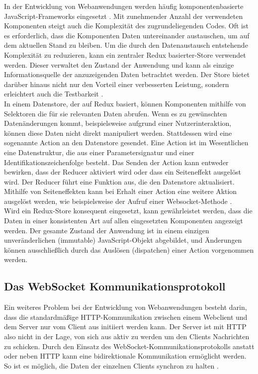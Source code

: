 \documentclass[12pt]{article} %
\begin{document}
In der Entwicklung von Webanwendungen werden häufig komponentenbasierte JavaScript-Frameworks eingesetzt \cite[1]{saks_javascript_2019}. 
Mit zunehmender Anzahl der verwendeten Komponenten steigt auch die Komplexität des zugrundeliegenden Codes. Oft ist es erforderlich, dass die Komponenten Daten untereinander austauschen, um auf dem aktuellen Stand zu bleiben. Um die durch den Datenaustausch entstehende Komplexität zu reduzieren, kann ein zentraler Redux basierter-Store verwendet werden. Dieser verwaltet den Zustand der Anwendung und kann als einzige Informationsquelle der anzuzeigenden Daten betrachtet werden. Der Store bietet darüber hinaus nicht nur den Vorteil einer verbesserten Leistung, sondern erleichtert auch die Testbarkeit \cite[31-32]{farhi_adding_2017}.
\\

In einem Datenstore, der auf Redux basiert, können Komponenten mithilfe von Selektoren die für sie relevanten Daten abrufen. Wenn es zu gewünschten Datenänderungen kommt, beispielsweise aufgrund einer Nutzerinteraktion, können diese Daten nicht direkt manipuliert werden. Stattdessen wird eine sogenannte Action an den Datenstore gesendet. Eine Action ist im Wesentlichen eine Datenstruktur, die aus einer Parametersignatur und einer Identifikationszeichenfolge besteht. Das Senden der Action kann entweder bewirken, dass der Reducer aktiviert wird oder dass ein Seiteneffekt ausgelöst wird. Der Reducer führt eine Funktion aus, die den Datenstore aktualisiert. Mithilfe von Seiteneffekten kann bei Erhalt einer Action eine weitere Aktion ausgelöst werden, wie beispielsweise der Aufruf einer Websocket-Methode
\cite[117-119]{thakkar_building_2020}. \\

Wird ein Redux-Store konsequent eingesetzt, kann gewährleistet werden, dass die Daten in einer konsistenten Art auf allen eingesetzten Komponenten angezeigt werden. Der gesamte Zustand der Anwendung ist in einem einzigen unveränderlichen (immutable) JavaScript-Objekt abgebildet, und Änderungen können ausschließlich durch das Auslösen (dispatchen) einer Action vorgenommen werden.


\subsection{Das WebSocket Kommunikationsprotokoll}

Ein weiteres Problem bei der Entwicklung von Webanwendungen besteht darin, dass die standardmäßige HTTP-Kommunikation zwischen einem Webclient und dem Server nur vom Client aus initiiert werden kann. Der Server ist mit HTTP also nicht in der Lage, von sich aus aktiv zu werden um den Clients Nachrichten zu schicken. Durch den Einsatz des WebSocket-Kommunikationsprotokolls anstatt oder neben HTTP kann eine bidirektionale Kommunikation ermöglicht werden. So ist es möglich, die Daten der einzelnen Clients synchron zu halten \cite[673]{furukawa_web-based_2011}.
\end{document}
